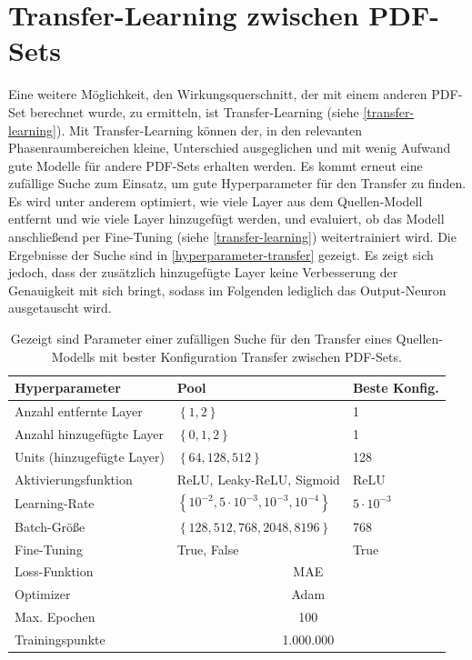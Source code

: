 \section{Transfer-Learning zwischen PDF-Sets}
Eine weitere Möglichkeit, den Wirkungsquerschnitt, der mit einem anderen PDF-Set berechnet wurde, zu ermitteln, ist Transfer-Learning (siehe \textsf{\autoref{transfer-learning}}). Mit Transfer-Learning können der, in den relevanten Phasenraumbereichen kleine, Unterschied ausgeglichen und mit wenig Aufwand gute Modelle für andere PDF-Sets erhalten werden. Es kommt erneut eine zufällige Suche zum Einsatz, um gute Hyperparameter für den Transfer zu finden. Es wird unter anderem optimiert, wie viele Layer aus dem Quellen-Modell entfernt und wie viele Layer hinzugefügt werden, und evaluiert, ob das Modell anschließend per Fine-Tuning (siehe \textsf{\autoref{transfer-learning}}) weitertrainiert wird. Die Ergebnisse der Suche sind in \textsf{\autoref{hyperparameter-transfer}} gezeigt. Es zeigt sich jedoch, dass der zusätzlich hinzugefügte Layer keine Verbesserung der Genauigkeit mit sich bringt, sodass im Folgenden lediglich das Output-Neuron ausgetauscht wird.
\begin{table}
	\centering
	\caption{Gezeigt sind Parameter einer zufälligen Suche für den Transfer eines Quellen-Modells mit bester Konfiguration Transfer zwischen PDF-Sets.}
	\begin{tabular}{lll}
		Hyperparameter & Pool & Beste Konfig. \\
		\hline\hline
		Anzahl entfernte Layer & $\left\lbrace  1, 2 \right\rbrace $ & 1 \\
		Anzahl hinzugefügte Layer & $\left\lbrace  0, 1, 2 \right\rbrace $ & 1 \\
		Units (hinzugefügte Layer) &$\left\lbrace 64, 128, 512\right\rbrace$ & 128\\
		Aktivierungsfunktion & ReLU, Leaky-ReLU, Sigmoid & ReLU \\
		Learning-Rate & $\left\lbrace 10^{-2}, 5 \cdot 10^{-3}, 10^{-3}, 10^{-4} \right\rbrace $ & $5 \cdot 10^{-3}$\\
		Batch-Größe & $\left\lbrace 128, 512, 768, 2048, 8196 \right\rbrace $ & 768\\
		Fine-Tuning & True, False & True \\
		\hline
		Loss-Funktion & \multicolumn{2}{c}{MAE} \\
		Optimizer & \multicolumn{2}{c}{Adam} \\
		Max. Epochen & \multicolumn{2}{c}{100}\\
		Trainingspunkte & \multicolumn{2}{c}{1.000.000} \\
		\hline
	\end{tabular}
	\label{hyperparameter-transfer}
\end{table}

